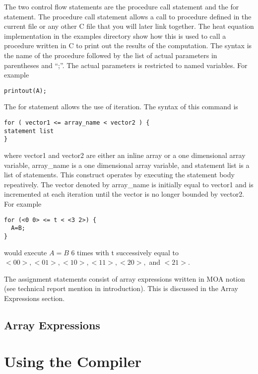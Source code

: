 The two control flow statements are the procedure call statement and the
for statement.  The procedure call statement allows a call to procedure defined
in the current file or any other C file that you will later link together.
The heat equation implementation in the examples directory show how this
is used to call a procedure written in C to print out the results of the
computation.  The syntax is the name of the procedure followed by the list
of actual parameters in parentheses and ``;''.  The actual parameters is 
restricted to named variables.  For example
\begin{verbatim}
printout(A);
\end{verbatim}
The for statement allows the use of iteration.  The syntax of this command
is
\begin{verbatim}
for ( vector1 <= array_name < vector2 ) {
statement list
}
\end{verbatim}
where vector1 and vector2 are either an inline array or a one dimensional
array variable, array\_name is a one dimensional array variable, and
statement list is a list of statements.  This construct operates by executing
the statement body repeatively.  The vector denoted by array\_name is 
initially equal to vector1 and is incremented at each iteration until the
vector is no longer bounded by vector2.  For example
\begin{verbatim}
for (<0 0> <= t < <3 2>) {
  A=B;
}
\end{verbatim}
would execute $A=B$ 6 times with t successively equal to $<0 0>, <0 1>,
<1 0>, <1 1>, <2 0>,$ and $<2 1>$.

The assignment statements consist of array expressions written in 
MOA notion (see technical report mention in introduction).  This is
discussed in the Array Expressions section.

\subsection{Array Expressions}

\section{Using the Compiler}


